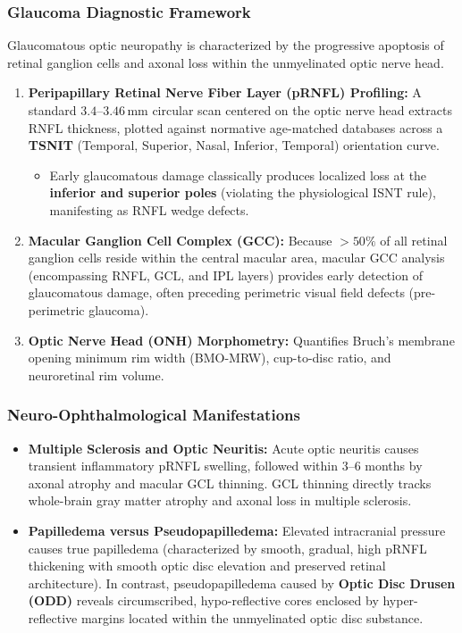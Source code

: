 \documentclass[11pt,a4paper]{article}
\begin{document}
\subsubsection{Glaucoma Diagnostic Framework}
Glaucomatous optic neuropathy is characterized by the progressive apoptosis of retinal ganglion cells and axonal loss within the unmyelinated optic nerve head.
\begin{enumerate}[leftmargin=*]
    \item \textbf{Peripapillary Retinal Nerve Fiber Layer (pRNFL) Profiling:} A standard $3.4\text{--}3.46\,\text{mm}$ circular scan centered on the optic nerve head extracts RNFL thickness, plotted against normative age-matched databases across a \textbf{TSNIT} (Temporal, Superior, Nasal, Inferior, Temporal) orientation curve.
    \begin{itemize}
        \item Early glaucomatous damage classically produces localized loss at the \textbf{inferior and superior poles} (violating the physiological ISNT rule), manifesting as RNFL wedge defects.
    \end{itemize}
    \item \textbf{Macular Ganglion Cell Complex (GCC):} Because $> 50\%$ of all retinal ganglion cells reside within the central macular area, macular GCC analysis (encompassing RNFL, GCL, and IPL layers) provides early detection of glaucomatous damage, often preceding perimetric visual field defects (pre-perimetric glaucoma).
    \item \textbf{Optic Nerve Head (ONH) Morphometry:} Quantifies Bruch's membrane opening minimum rim width (BMO-MRW), cup-to-disc ratio, and neuroretinal rim volume.
\end{enumerate}

\subsubsection{Neuro-Ophthalmological Manifestations}
\begin{itemize}[leftmargin=*]
    \item \textbf{Multiple Sclerosis and Optic Neuritis:} Acute optic neuritis causes transient inflammatory pRNFL swelling, followed within $3\text{--}6$ months by axonal atrophy and macular GCL thinning. GCL thinning directly tracks whole-brain gray matter atrophy and axonal loss in multiple sclerosis.
    \item \textbf{Papilledema versus Pseudopapilledema:} Elevated intracranial pressure causes true papilledema (characterized by smooth, gradual, high pRNFL thickening with smooth optic disc elevation and preserved retinal architecture). In contrast, pseudopapilledema caused by \textbf{Optic Disc Drusen (ODD)} reveals circumscribed, hypo-reflective cores enclosed by hyper-reflective margins located within the unmyelinated optic disc substance.
\end{itemize}
\end{document}
